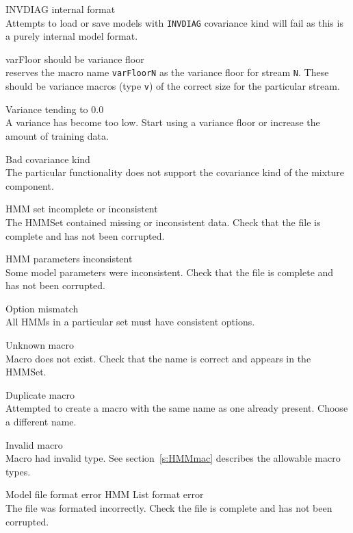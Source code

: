 \begin{itemize}
\begin{itemize}
    INVDIAG internal format\\
        Attempts to load or save models with \texttt{INVDIAG} covariance kind
        will fail as this is a purely internal model format.

 varFloor should be variance floor\\
         reserves the macro name \texttt{varFloorN} as the 
        variance floor for stream \texttt{N}.  These should be variance 
        macros (type \texttt{v}) of the correct size for the particular stream.

    Variance tending to 0.0\\
        A variance has become too low.  Start using a variance floor or 
        increase the amount of training data.
        
 Bad covariance kind\\
        The particular functionality does not support the covariance
        kind of the mixture component.

    HMM set incomplete or inconsistent\\
        The HMMSet contained missing or inconsistent data.  Check that the 
        file is complete and has not been corrupted.

    HMM parameters inconsistent\\
        Some model parameters were inconsistent.  Check that the file is 
        complete and has not been corrupted.

 Option mismatch\\
        All HMMs in a particular set must have consistent options.

    Unknown macro\\
        Macro does not exist.  Check that the name is correct and appears 
        in the HMMSet.

    Duplicate macro\\
        Attempted to create a macro with the same name as one already present.
        Choose a different name.

    Invalid macro\\
        Macro had invalid type.  See section~\ref{s:HMMmac} describes the 
        allowable macro types.

    Model file format error
    HMM List format error\\
        The file was formated incorrectly.  Check the file is complete and
        has not been corrupted.


\end{itemize}
\end{itemize}
